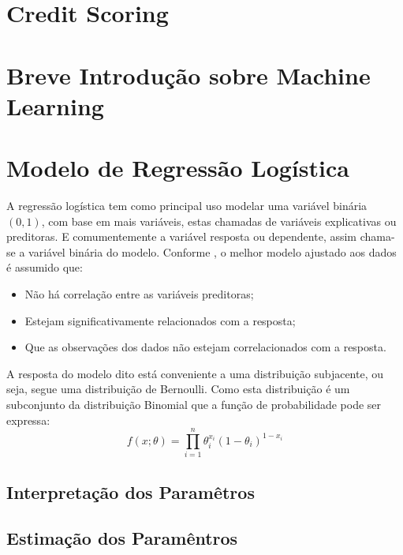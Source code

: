 \documentclass[
	12pt,				%
	openright,			%
	oneside,      %
	a4paper,			%
	english,			%
	french,				%
	spanish,			%
	brazil,				%
	]{abntex2}\usepackage[]{graphicx}\usepackage[]{xcolor}
\begin{document}
  \section{Credit Scoring}
  
  
  
  
  \section{Breve Introdução sobre Machine Learning}
  
  
  
  
  
  
  \section{Modelo de Regressão Logística}
  
A regressão logística tem como principal uso modelar uma variável binária $(0,1)$,
com base em mais variáveis, estas chamadas de variáveis explicativas ou preditoras.
E comumentemente a variável resposta ou dependente, assim chama-se a variável
binária do modelo. Conforme \cite{hilbe2016practical}, o melhor modelo ajustado 
aos dados é assumido que:
\begin{itemize}
  \item Não há correlação entre as variáveis preditoras;
  \item Estejam significativamente relacionados com a resposta;
  \item Que as observações dos dados não estejam correlacionados com a resposta.
\end{itemize}
  
A resposta do modelo dito está conveniente a uma distribuição subjacente, ou seja,
segue uma distribuição de Bernoulli. Como esta distribuição é um subconjunto da distribuição 
Binomial que a função de probabilidade pode ser expressa:
\begin{equation}
  f(x;\theta) = \prod_{i = 1}^{n}\theta_{i}^{x_i}(1 - \theta_{i})^{1 - x_i}
\end{equation}





      \subsection{Interpretação dos Paramêtros}




      \subsection{Estimação dos Paramêntros}
\end{document}
